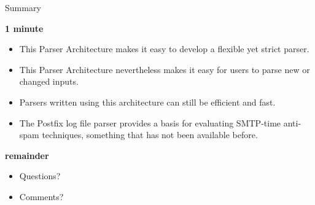 \documentclass{beamer}
\newcommand{\timingnote}[1]{%
    \textbf{#1}%
}
\begin{document}
\begin{frame}{Summary}

    \timingnote{1 minute}

    \begin{itemize}

        \item This Parser Architecture makes it easy to develop a flexible
            yet strict parser.

        \item This Parser Architecture nevertheless makes it easy for users
            to parse new or changed inputs.

        \item Parsers written using this architecture can still be
            efficient and fast.

        \item The Postfix log file parser provides a basis for evaluating
            SMTP-time anti-spam techniques, something that has not been
            available before.

    \end{itemize}

    \timingnote{remainder}

    \begin{itemize}

        \item Questions?

        \item Comments?

    \end{itemize}

\end{frame}
\end{document}
